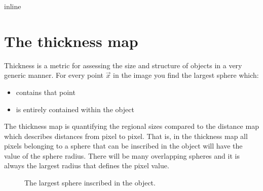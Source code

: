 \documentclass[letterpaper,10pt,english]{sphinxmanual}
\begin{document}
\noindent{}

\begin{sphinxVerbatim}[commandchars=\\\{\}]
     
   
   
   
   
 inline
\end{sphinxVerbatim}


\chapter{The thickness map}
\label{\detokenize{06-AdvancedShapeAndTexture:the-thickness-map}}
\sphinxAtStartPar
Thickness is a metric for assessing the size and structure of objects in a very generic manner.
For every point \(\vec{x}\) in the image you find the largest sphere which:
\begin{itemize}
\item {} 
\sphinxAtStartPar
contains that point

\item {} 
\sphinxAtStartPar
is entirely contained within the object

\end{itemize}

\sphinxAtStartPar
The thickness map is quantifying the regional sizes compared to the distance map which describes distances from pixel to pixel. That is, in the thickness map all pixels belonging to a sphere that can be inscribed in the object will have the value of the sphere radius. There will be many overlapping spheres and it is always the largest radius that defines the pixel value.

\begin{figure}[htbp]
\centering
\capstart

\noindent{}
\caption{The largest sphere inscribed in the object.}\label{\detokenize{06-AdvancedShapeAndTexture:id2}}\end{figure}
\end{document}

